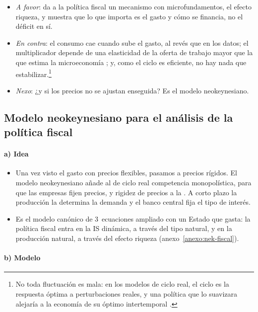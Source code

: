 \documentclass[11pt]{article}
\begin{document}
\begin{itemize}
\item \emph{A favor}: da a la política fiscal un mecanismo con microfundamentos, el efecto riqueza, y muestra que lo que importa es el gasto y cómo se financia, no el déficit en sí.
\item \emph{En contra}: el consumo cae cuando sube el gasto, al revés que en los datos; el multiplicador depende de una elasticidad de la oferta de trabajo mayor que la que estima la microeconomía ; y, como el ciclo es eficiente, no hay nada que estabilizar.\footnote{No toda fluctuación es mala: en los modelos de ciclo real, el ciclo es la respuesta óptima a perturbaciones reales, y una política que lo suavizara alejaría a la economía de su óptimo intertemporal .}
\item \emph{Nexo}: ¿y si los precios no se ajustan enseguida? Es el modelo neokeynesiano.
\end{itemize}

\subsection{Modelo neokeynesiano para el análisis de la política fiscal}\label{sec:nek-fiscal}

\paragraph{a) Idea}

\begin{itemize}
\item Una vez visto el gasto con precios flexibles, pasamos a precios rígidos. El modelo neokeynesiano añade al de ciclo real competencia monopolística, para que las empresas fijen precios, y rigidez de precios a la  . A corto plazo la producción la determina la demanda y el banco central fija el tipo de interés.
\item Es el modelo canónico de 3~ecuaciones ampliado con un Estado que gasta: la política fiscal entra en la IS dinámica, a través del tipo natural, y en la producción natural, a través del efecto riqueza (anexo~\ref{anexo:nek-fiscal}).
\end{itemize}

\paragraph{b) Modelo}
\end{document}
